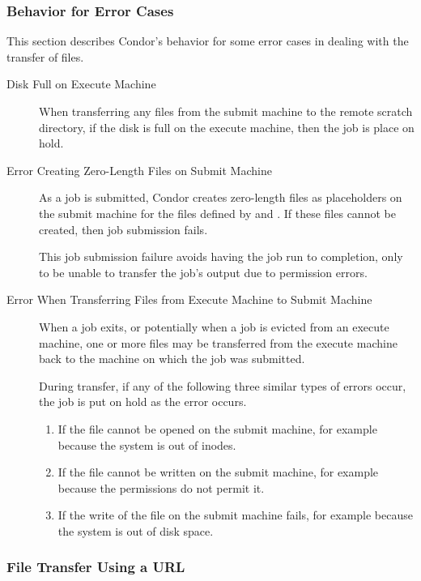 \subsubsection{Behavior for Error Cases}
This section describes Condor's behavior for some error cases
in dealing with the transfer of files.
\begin{description}
\item[Disk Full on Execute Machine]
  When transferring any files from the submit machine to the remote scratch
  directory,
  if the disk is full on the execute machine,
  then the job is place on hold.
\item[Error Creating Zero-Length Files on Submit Machine]
  As a job is submitted, Condor creates zero-length files as placeholders
  on the submit machine for the files defined by 
   and .
  If these files cannot be created, then job submission fails.

  This job submission failure avoids having the job run to completion,
  only to be unable to transfer the job's output due to permission errors.
\item[Error When Transferring Files from Execute Machine to Submit Machine]
  When a job exits, or potentially when a job is evicted from an execute
  machine, one or more files may be transferred from the execute machine
  back to the machine on which the job was submitted.

  During transfer, if any of the following three similar types of errors occur,
  the job is put on hold as the error occurs.
  \begin{enumerate}
  \item If the file cannot be opened on the submit machine, for example
    because the system is out of inodes.
  \item If the file cannot be written on the submit machine, for example
    because the permissions do not permit it.
  \item If the write of the file on the submit machine fails, for example
    because the system is out of disk space.
  \end{enumerate}
\end{description}

\subsubsection{File Transfer Using a URL \label{sec:file-transfer-by-URL}}

